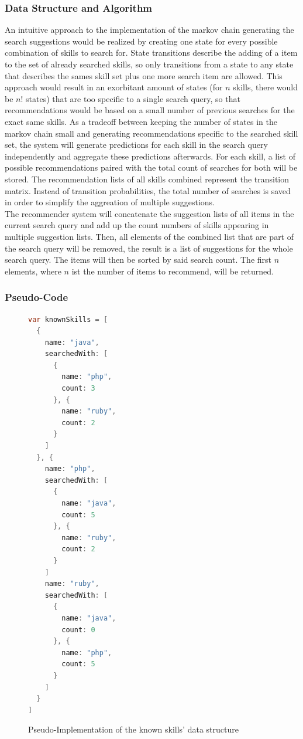 \subsubsection{Data Structure and Algorithm}
An intuitive approach to the implementation of the markov chain generating the search suggestions would be realized by creating one state for every possible combination of skills to search for. State transitions describe the adding of a item to the set of already searched skills, so only transitions from a state to any state that describes the sames skill set plus one more search item are allowed. This approach would result in an exorbitant amount of states (for $n$ skills, there would be $n!$ states) that are too specific to a single search query, so that recommendations would be based on a small number of previous searches for the exact same skills.
As a tradeoff between keeping the number of states in the markov chain small and generating recommendations specific to the searched skill set, the system will generate predictions for each skill in the search query independently and aggregate these predictions afterwards. For each skill, a list of possible recommendations paired with the total count of searches for both will be stored. The recommendation lists of all skills combined represent the transition matrix. Instead of transition probabilities, the total number of searches is saved in order to simplify the aggreation of multiple suggestions.\\
The recommender system will concatenate the suggestion lists of all items in the current search query and add up the count numbers of skills appearing in multiple suggestion lists. Then, all elements of the combined list that are part of the search query will be removed, the result is a list of suggestions for the whole search query. The items will then be sorted by said search count. The first $n$ elements, where $n$ ist the number of items to recommend, will be returned.\\

\newpage

\subsubsection{Pseudo-Code}
\begin{figure}[!htp]
\begin{lstlisting}[language=Java]
var knownSkills = [
  {
    name: "java",
    searchedWith: [
      {
        name: "php",
        count: 3
      }, {
        name: "ruby",
        count: 2
      }
    ]
  }, {
    name: "php",
    searchedWith: [
      {
        name: "java",
        count: 5
      }, {
        name: "ruby",
        count: 2
      }
    ]
    name: "ruby",
    searchedWith: [
      {
        name: "java",
        count: 0
      }, {
        name: "php",
        count: 5
      }
    ]
  }
]
\end{lstlisting}
\caption[Data Structure: Known Skill]{Pseudo-Implementation of the known skills' data structure}
\end{figure}

